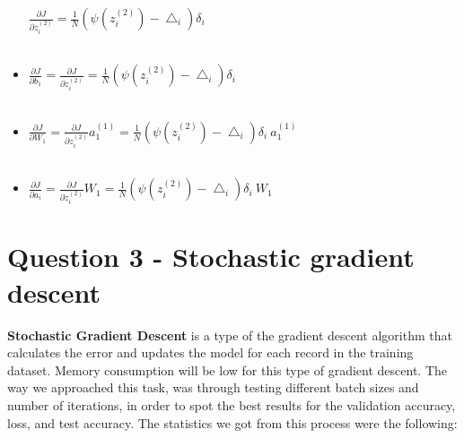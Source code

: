 \documentclass[
	12pt, %
]{fphw}
\begin{document}
\begin{itemize}
$\frac {\partial J}{\partial z_{i}^{(2)}} = \frac{1}{N} (\psi(z_{i}^{(2)}) - \bigtriangleup_i) \delta_i$ \\ \\

\item $\frac {\partial J}{\partial b_1} = \frac {\partial J}{\partial z_{i}^{(2)}} = \frac{1}{N} (\psi(z_{i}^{(2)}) - \bigtriangleup_i) \delta_i$ \\ \\

\item $\frac {\partial J}{\partial W_1} = \frac {\partial J}{\partial z_{i}^{(2)}} a_{1}^{(1)} = \frac{1}{N} (\psi(z_{i}^{(2)}) - \bigtriangleup_i) \delta_i \ a_{1}^{(1)}$ \\ \\

\item $\frac {\partial J}{\partial a_i} = \frac {\partial J}{\partial z_{i}^{(2)}} W_1 = \frac{1}{N} (\psi(z_{i}^{(2)}) - \bigtriangleup_i) \delta_i \ W_1$

\end{itemize}

\newpage
\section*{Question 3 - Stochastic gradient descent }
\textbf{Stochastic Gradient Descent} is a type of the gradient descent algorithm that calculates the error and updates the model for each record in the training dataset. Memory consumption will be low for this type of gradient descent. The way we approached this task, was through testing different batch sizes and number of iterations, in order to spot the best results for the validation accuracy, loss, and test accuracy. The statistics we got from this process were the following:
\end{document}
